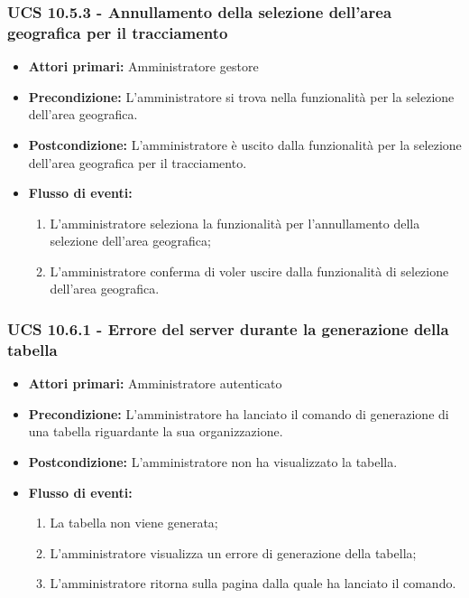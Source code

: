 \subsubsection{UCS 10.5.3 - Annullamento della selezione dell'area geografica per il tracciamento}%
\begin{itemize}
\item \textbf{Attori primari:} Amministratore gestore
\item \textbf{Precondizione:} L'amministratore si trova nella funzionalità per la selezione dell'area geografica.
\item \textbf{Postcondizione:} L'amministratore è uscito dalla funzionalità per la selezione dell'area geografica per il tracciamento.
\item \textbf{Flusso di eventi:}
    \begin{enumerate}
    \item L'amministratore seleziona la funzionalità per l'annullamento della selezione dell'area geografica;
    \item L'amministratore conferma di voler uscire dalla funzionalità di selezione dell'area geografica.
    \end{enumerate} 
\end{itemize}

\subsubsection{UCS 10.6.1 - Errore del server durante la generazione della tabella}
\begin{itemize}
    \item \textbf{Attori primari:} Amministratore autenticato
    \item \textbf{Precondizione:} L'amministratore ha lanciato il comando di generazione di una tabella riguardante la sua organizzazione.
    \item \textbf{Postcondizione:} L'amministratore non ha visualizzato la tabella.
    \item \textbf{Flusso di eventi:} \begin{enumerate}
    \item La tabella non viene generata;
    \item L'amministratore visualizza un errore di generazione della tabella;
    \item L'amministratore ritorna sulla pagina dalla quale ha lanciato il comando.
    \end{enumerate}
\end{itemize}